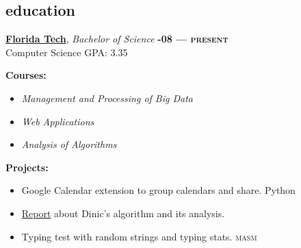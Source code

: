 \documentclass[margin,10pt]{res}
\begin{document}
\begin{resume}

    \section{\sc \lsstyle education}
        \href{https://www.fit.edu/}{\textbf{Florida Tech}}, \textit{Bachelor of Science}
        \hfill
        \textsc{\bfseries{}-08 --- present}
        \\
        Computer Science
        \hfill
        GPA: 3.35
        \vspace{0.5em}
        \begin{description}
            \item[\textbf{Courses:}]
        \end{description}
        \begin{itemize}
            \item \textit{Management and Processing of Big Data}
            \item \textit{Web Applications}
            \item \textit{Analysis of Algorithms}
        \end{itemize}
        \begin{description}
            \item[\textbf{Projects:}]
        \end{description}
        \begin{itemize}
            \item Google Calendar extension to group calendars and share.
            \hfill
            Python
            \item \href{https://github.com/gronk-droid/cse4081/blob/607f375da2e1c2aedf6d1330a80537ea768698d2/2_group_assignment/docs/report.pdf}{Report} about Dinic's algorithm and its analysis.
            \item Typing test with random strings and typing stats.
            \hfill
            \textsc{masm}
        \end{itemize}


\end{resume}
\end{document}
